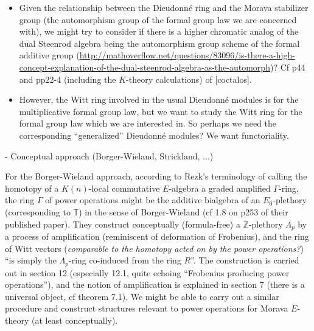 \documentclass{rs}
\theoremstyle{definition}
\theoremstyle{remark}
\newcommand{\mb}[1]{\mathbb{#1}}
\renewcommand{\=}{\approx}
\renewcommand{\-}{\sim}
\numberwithin{equation}{section}
\numberwithin{thm}{section}
\begin{document}
\begin{itemize}
{\em The category of graded, bicommutative Hopf algebras over the
prime field with $p$ elements is an abelian category which is equivalent, by work
of Schoeller, to a category of graded modules, known as Dieudonn\'e modules.
Graded ring objects in Hopf algebras are called Hopf rings, and they arise
in the study of unstable cohomology operations for extraordinary cohomology
theories. The central point of this paper is that Hopf rings can be studied by
looking at the associated ring object in Dieudonn\'e modules. They can also be
computed there,} ...

\item Given the relationship between the Dieudonn\'e ring and the Morava stabilizer group (the automorphism group of the formal group law we are concerned with), 
we might try to consider if there is a higher chromatic analog of the dual Steenrod algebra being the automorphism group scheme of the formal additive group 
(\url{http://mathoverflow.net/questions/83096/is-there-a-high-concept-explanation-of-the-dual-steenrod-algebra-as-the-automorph})? 
Cf p44 and pp22-4 (including the $K$-theory calculations) of [coctalos].

\item However, the Witt ring involved in the usual Dieudonn\'e modules is for the multiplicative formal group law, 
but we want to study the Witt ring for the formal group law which we are interested in. 
So perhaps we need the corresponding ``generalized'' Dieudonn\'e modules? We want functoriality.
\end{itemize}

- Conceptual approach (Borger-Wieland, Strickland, ...)

For the Borger-Wieland approach, according to Rezk's terminology of calling the homotopy of a $K(n)$-local commutative $E$-algebra a graded amplified $\Gamma$-ring, 
the ring $\Gamma$ of power operations might be the additive bialgebra of an $E_0$-plethory (corresponding to $\mb T$) in the sense of Borger-Wieland 
(cf 1.8 on p253 of their published paper). They construct conceptually (formula-free) a $\mb Z$-plethory $\Lambda_p$ by a process of amplification 
(reminiscent of deformation of Frobenius), and the ring of Witt vectors ({\em comparable to the homotopy acted on by the power operations?}) 
``is simply the $\Lambda_p$-ring co-induced from the ring $R$''. The construction is carried out in section 12 
(especially 12.1, quite echoing ``Frobenius producing power operations''), and the notion of amplification is explained in section 7 (there is a universal object, cf theorem 7.1). 
We might be able to carry out a similar procedure and construct structures relevant to power operations for Morava $E$-theory (at least conceptually).
\end{document}
